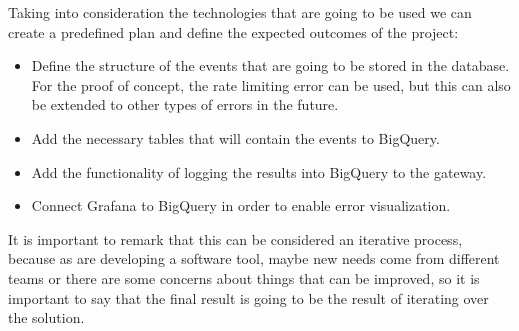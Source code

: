 \documentclass[12pt]{article}
\begin{document}
Taking into consideration the technologies that are going to be used we can create a predefined plan and define the expected outcomes of the project:

\begin{itemize}
    \item Define the structure of the events that are going to be stored in the database. For the proof of concept, the rate limiting error can be used, but this can also be extended to other types of errors in the future.
    \item Add the necessary tables that will contain the events to BigQuery.
    \item Add the functionality of logging the results into BigQuery to the gateway.
    \item Connect Grafana to BigQuery in order to enable error visualization.
\end{itemize}

It is important to remark that this can be considered an iterative process, because as  are developing a software tool, maybe new needs come from different teams or there are some concerns about things that can be improved, so it is important to say that the final result is going to be the result of iterating over the solution.
\end{document}
